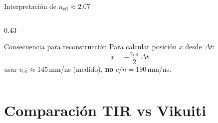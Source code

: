 \documentclass[aspectratio=169,10pt]{beamer}
\begin{document}
\begin{frame}{Interpretación de $n_\text{eff} \approx 2.07$}
\begin{columns}[T]
\begin{column}{0.43\textwidth}

  \vspace{0.3em}
  \begin{alertblock}{\footnotesize Consecuencia para reconstrucción}
  \footnotesize
  Para calcular posición $x$ desde $\Delta t$:
  \[x = -\frac{v_\text{eff}}{2}\,\Delta t\]
  usar $v_\text{eff} \approx 145$\,mm/ns (medido),
  \textbf{no} $c/n = 190$\,mm/ns.
  \end{alertblock}
  \end{column}
\end{columns}
\end{frame}

\section{Comparación TIR vs Vikuiti}
\end{document}
